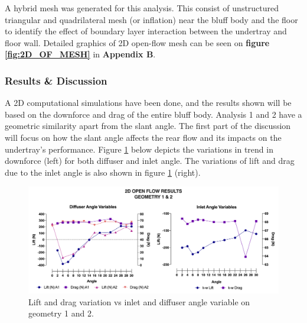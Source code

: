 \noindent A hybrid mesh was generated for this analysis. This consist of unstructured triangular and quadrilateral mesh (or inflation) near the bluff body and the floor to identify the effect of boundary layer interaction between the undertray and floor wall.  Detailed graphics of 2D open-flow mesh can be seen on \textbf{figure \ref{fig:2D_OF_MESH}} in \textbf{Appendix B}.

\subsubsection{Results \& Discussion}

\noindent A 2D computational simulations have been done, and the results shown will be based on the downforce and drag of the entire bluff body. Analysis 1 and 2 have a geometric similarity apart from the slant angle. The first part of the discussion will focus on how the slant angle affects the rear flow and its impacts on the undertray's performance. Figure \ref{fig:2D_OF_A12_results} below depicts the variations in trend in downforce (left) for both diffuser and inlet angle. The variations of lift and drag due to the inlet angle is also shown in figure \ref{fig:2D_OF_A12_results} (right).

\begin{figure}[!ht]
    \centering
    \includegraphics[scale = 0.6]{Figures/Graph/2D_OF_A1-2.png}
    \caption{Lift and drag variation vs inlet and diffuser angle variable on geometry 1 and 2. }
    \label{fig:2D_OF_A12_results}
\end{figure}

